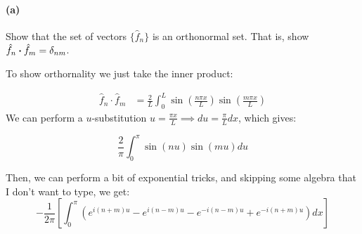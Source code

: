 \documentclass{article}
\begin{document}
\paragraph{(a)}
Show that the set of vectors $\{\hat{f}_{n}\}$ is an orthonormal set.  That is, show $\hat{f}_{n}\boldsymbol{\cdot}\hat{f}_{m} = \delta_{nm}$.

\begin{solution}
    To show orthornality we just take the inner product:

    \begin{align*}
        \hat f_n \cdot \hat f_m &= \frac{2}{L} \int_0^L \sin\left( \frac{n \pi x}{L}\right) \sin\left(\frac{m \pi x}{L}\right)
    \end{align*}
    We can perform a $u$-substitution $u = \frac{\pi x}{L} \implies du = \frac{\pi}{L} dx$, which gives:

    \[ \frac{2}{\pi} \int_0^\pi \sin(nu) \sin(mu) du\]

    Then, we can perform a bit of exponential tricks, and skipping some algebra that I don't want to type, we get:
    \[ -\frac{1}{2\pi}\left[\int_0^\pi \left( e^{i(n + m)u } - e^{i(n - m) u} - e^{-i(n - m) u} + e^{-i(n + m)u}\right) dx\right]\]


\end{solution}
\end{document}
